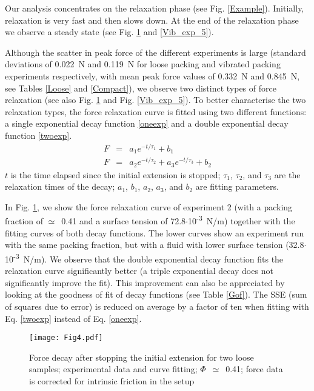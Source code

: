 Our analysis concentrates on the relaxation phase (see Fig. \ref{Example}). Initially, relaxation is very fast and then slows down. At the end of the relaxation phase we observe a steady state (see Fig. \ref{Loose_exp_2} and \ref{Vib_exp_5}).

Although the scatter in peak force of the different experiments is large (standard deviations of 0.022~\si{N} and 0.119~\si{N} for loose packing and vibrated packing experiments respectively, with mean peak force values of 0.332~\si{N} and 0.845~\si{N}, see Tables \ref{Loose} and \ref{Compact}), we observe two distinct types of force relaxation (see also Fig. \ref{Loose_exp_2} and Fig. \ref{Vib_exp_5}). To better characterise the two relaxation types, the force relaxation curve is fitted using two different functions: a single exponential decay function \eqref{oneexp} and a double exponential decay function \eqref{twoexp}.
\begin{eqnarray}\label{oneexp}
\displaystyle F&=&a_1e^{-t/\tau_1}+b_1\\\label{twoexp}
\displaystyle F&=&a_2e^{-t/\tau_2}+a_3e^{-t/\tau_3}+b_2
\end{eqnarray}
$t$ is the time elapsed since the initial extension is stopped; $\tau_1$, $\tau_2$, and $\tau_3$ are the relaxation times of the decay; $a_1$, $b_1$, $a_2$, $a_3$, and $b_2$ are fitting parameters.

In Fig. \ref{Loose_exp_2}, we show the force relaxation curve of experiment 2 (with a packing fraction of $\simeq$~0.41 and a surface tension of 72.8$\cdot$10\textsuperscript{-3}~\si{N/m}) together with the fitting curves of both decay functions. The lower curves show an experiment run with the same packing fraction, but with a fluid with lower surface tension (32.8$\cdot$10\textsuperscript{-3}~\si{N/m}). We observe that the double exponential decay function fits the relaxation curve significantly better (a triple exponential decay does not significantly improve the fit). This improvement can also be appreciated by looking at the goodness of fit of decay functions (see Table \ref{Gof}). The SSE (sum of squares due to error) is reduced on average by a factor of ten when fitting with Eq. \eqref{twoexp} instead of Eq. \eqref{oneexp}.

\begin{figure}[h!]
\texttt{[image: Fig4.pdf]}
\caption{Force decay after stopping the initial extension for two loose samples; experimental data and curve fitting; $\Phi$~$\simeq$~0.41; force data is corrected for intrinsic friction in the setup}
\label{Loose_exp_2}
\end{figure}

